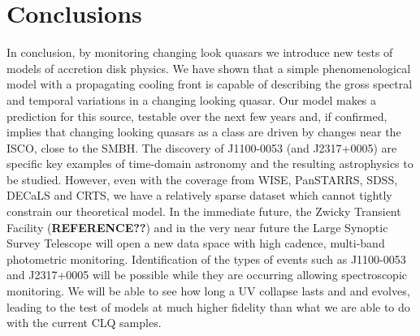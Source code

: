 \documentclass{nature}
\begin{document}
\section{Conclusions} 
In conclusion, by monitoring changing look quasars we introduce 
new tests of models of accretion disk physics. We have shown that a 
simple phenomenological model with a propagating cooling front is
capable 
of describing the gross spectral and temporal variations in a changing
looking 
quasar. Our model makes a prediction for this source, testable over
the 
next few years and, if confirmed, implies that changing looking 
quasars as a class are driven by changes near the ISCO, close to the
 SMBH. The discovery of J1100-0053 (and J2317+0005) are specific 
key examples of time-domain astronomy and the resulting 
astrophysics to be studied. However, even with the coverage from WISE,
 PanSTARRS, SDSS, DECaLS and CRTS, we have a relatively sparse 
dataset which cannot tightly constrain our theoretical model. In the 
immediate future, the Zwicky Transient Facility ({\bf REFERENCE??}) 
and in the very near future the Large Synoptic Survey Telescope 
\citep{Ivezic2008, LSST_ScienceBookV2} will open a new data space 
with high cadence, multi-band photometric monitoring. Identification
 of the types of events such as J1100-0053 and J2317+0005 will be 
possible while they are occurring allowing spectroscopic monitoring. 
We will be able to see how long a UV collapse lasts and and evolves, 
leading to the test of models at much higher fidelity than what we are 
able to do with the current CLQ samples.




%

\end{document}
